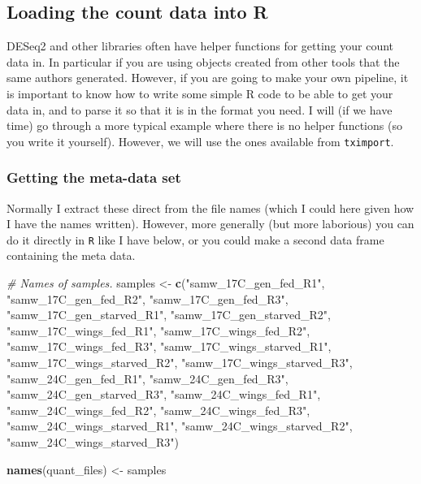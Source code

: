 \documentclass[
]{article}
\newenvironment{Shaded}{\begin{snugshade}}{\end{snugshade}}
\newcommand{\CommentTok}[1]{\textcolor[rgb]{0.56,0.35,0.01}{\textit{#1}}}
\newcommand{\KeywordTok}[1]{\textcolor[rgb]{0.13,0.29,0.53}{\textbf{#1}}}
\newcommand{\NormalTok}[1]{#1}
\newcommand{\StringTok}[1]{\textcolor[rgb]{0.31,0.60,0.02}{#1}}
\begin{document}
\hypertarget{loading-the-count-data-into-r}{%
\subsection{Loading the count data into
R}\label{loading-the-count-data-into-r}}

DESeq2 and other libraries often have helper functions for getting your
count data in. In particular if you are using objects created from other
tools that the same authors generated. However, if you are going to make
your own pipeline, it is important to know how to write some simple R
code to be able to get your data in, and to parse it so that it is in
the format you need. I will (if we have time) go through a more typical
example where there is no helper functions (so you write it yourself).
However, we will use the ones available from \texttt{tximport}.

\hypertarget{getting-the-meta-data-set}{%
\subsubsection{Getting the meta-data
set}\label{getting-the-meta-data-set}}

Normally I extract these direct from the file names (which I could here
given how I have the names written). However, more generally (but more
laborious) you can do it directly in \texttt{R} like I have below, or
you could make a second data frame containing the meta data.

\begin{Shaded}
\begin{Highlighting}[]
\CommentTok{# Names of samples.}
\NormalTok{samples <-}\StringTok{ }\KeywordTok{c}\NormalTok{(}\StringTok{"samw_17C_gen_fed_R1"}\NormalTok{, }
             \StringTok{"samw_17C_gen_fed_R2"}\NormalTok{, }
             \StringTok{"samw_17C_gen_fed_R3"}\NormalTok{,}
             \StringTok{"samw_17C_gen_starved_R1"}\NormalTok{, }
             \StringTok{"samw_17C_gen_starved_R2"}\NormalTok{, }
             \StringTok{"samw_17C_wings_fed_R1"}\NormalTok{, }
             \StringTok{"samw_17C_wings_fed_R2"}\NormalTok{,}
             \StringTok{"samw_17C_wings_fed_R3"}\NormalTok{, }
             \StringTok{"samw_17C_wings_starved_R1"}\NormalTok{,}
             \StringTok{"samw_17C_wings_starved_R2"}\NormalTok{,}
             \StringTok{"samw_17C_wings_starved_R3"}\NormalTok{, }
             \StringTok{"samw_24C_gen_fed_R1"}\NormalTok{,}
             \StringTok{"samw_24C_gen_fed_R3"}\NormalTok{,}
             \StringTok{"samw_24C_gen_starved_R3"}\NormalTok{,}
             \StringTok{"samw_24C_wings_fed_R1"}\NormalTok{,}
             \StringTok{"samw_24C_wings_fed_R2"}\NormalTok{,}
             \StringTok{"samw_24C_wings_fed_R3"}\NormalTok{,}
             \StringTok{"samw_24C_wings_starved_R1"}\NormalTok{,}
             \StringTok{"samw_24C_wings_starved_R2"}\NormalTok{,}
             \StringTok{"samw_24C_wings_starved_R3"}\NormalTok{)}

\KeywordTok{names}\NormalTok{(quant_files) <-}\StringTok{ }\NormalTok{samples}
\end{Highlighting}
\end{Shaded}
\end{document}
